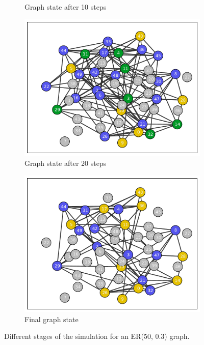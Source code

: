 \documentclass[11pt]{article} %
\begin{document}
\begin{figure}[tbp]
\begin{subfigure}[b]{0.5\textwidth}
    \caption{Graph state after 10 steps}
  \end{subfigure}
  \begin{subfigure}[b]{0.5\textwidth}
    \centering
    \includegraphics[width=\textwidth]{figures/evo_ER_50_03_20}
    \caption{Graph state after 20 steps}
  \end{subfigure}
  \begin{subfigure}[b]{0.5\textwidth}
    \centering
    \includegraphics[width=\textwidth]{figures/evo_ER_50_03_final}
    \caption{Final graph state}
  \end{subfigure}
  \caption{Different stages of the simulation for an ER(50, 0.3) graph.}
  \label{fig:er_graph_evo}
\end{figure}
\end{document}
